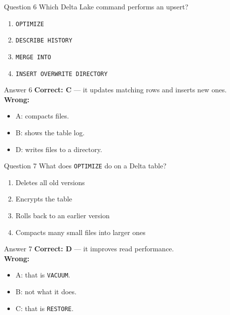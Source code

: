 \documentclass[aspectratio=169,11pt]{beamer}
\begin{document}
\begin{frame}{Question 6}
Which Delta Lake command performs an upsert?
\begin{enumerate}[label=\Alph*.]
\item \texttt{OPTIMIZE}
\item \texttt{DESCRIBE HISTORY}
\item \texttt{MERGE INTO}
\item \texttt{INSERT OVERWRITE DIRECTORY}
\end{enumerate}
\end{frame}
\begin{frame}{Answer 6}
\textbf{Correct: C} --- it updates matching rows and inserts new ones.\\
\vspace{0.5em}
\textbf{Wrong:}
\begin{itemize}
\item A: compacts files.
\item B: shows the table log.
\item D: writes files to a directory.
\end{itemize}
\end{frame}

\begin{frame}{Question 7}
What does \texttt{OPTIMIZE} do on a Delta table?
\begin{enumerate}[label=\Alph*.]
\item Deletes all old versions
\item Encrypts the table
\item Rolls back to an earlier version
\item Compacts many small files into larger ones
\end{enumerate}
\end{frame}
\begin{frame}{Answer 7}
\textbf{Correct: D} --- it improves read performance.\\
\vspace{0.5em}
\textbf{Wrong:}
\begin{itemize}
\item A: that is \texttt{VACUUM}.
\item B: not what it does.
\item C: that is \texttt{RESTORE}.
\end{itemize}
\end{frame}
\end{document}
